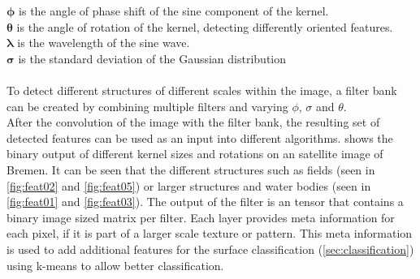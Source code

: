 \documentclass[12pt,a4paper, english,twoside]{scrartcl}
\begin{document}
      $\boldsymbol{\phi}$ is the angle of phase shift of the sine component of the kernel. \\
      $\boldsymbol{\theta}$ is the angle of rotation of the kernel, detecting differently oriented features.\\
      $\boldsymbol{\lambda}$ is the wavelength of the sine wave. \\
      $\boldsymbol{\sigma}$ is the standard deviation of the Gaussian distribution\\ \\
    \noindent
    To detect different structures of different scales within the image, a filter bank can be created by combining multiple filters and varying $\phi$, $\sigma$ and $\theta$.\\
    After the convolution of the image with the filter bank, the resulting set of detected features can be used as an input into different algorithms.
     shows the binary output of different kernel sizes and rotations on an satellite image of Bremen. 
    It can be seen that the different structures such as fields (seen in \cref{fig:feat02} and \cref{fig:feat05}) or larger structures and water bodies (seen in \cref{fig:feat01} and \cref{fig:feat03}).
    The output of the filter is an tensor that contains a binary image sized matrix per filter. Each layer provides meta information for each pixel, if it is part of a larger scale texture or pattern. 
    This meta information is used to add additional features for the surface classification (\cref{sec:classification}) using k-means %
    to allow better classification.%
\end{document}
